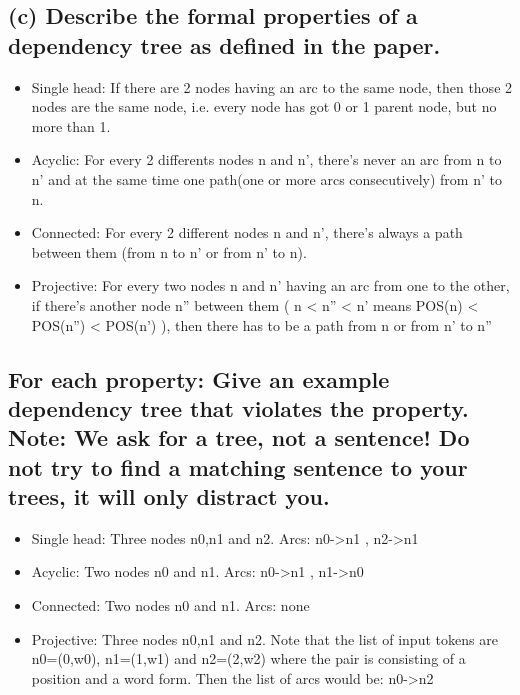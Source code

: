 \documentclass[paper=a4, fontsize=11pt]{scrartcl} %
\numberwithin{equation}{section} %
\numberwithin{figure}{section} %
\numberwithin{table}{section} %
\begin{document}
\subsection*{(c) Describe the formal properties of a dependency tree as defined in the paper.}

\begin{itemize}
	\item Single head: If there are 2 nodes having an arc to the same node, then those 2 nodes are the same node, i.e. every node has got 0 or 1 parent node, but no more than 1.
	\item Acyclic: For every 2 differents nodes n and n', there's never an arc from n to n' and at the same time one path(one or more arcs consecutively) from n' to n.
	\item Connected: For every 2 different nodes n and n', there's always a path between them (from n to n' or from n' to n).
	\item Projective: For every two nodes n and n' having an arc from one to the other, if there's another node n'' between them ( n < n'' < n' means POS(n) < POS(n'') < POS(n') ), then there has to be a path from n or from n' to n''
\end{itemize}

\subsection*{For each property: Give an example dependency tree that violates the property. Note: We ask for a tree, not a sentence! Do not try to find a matching sentence to your trees, it will only distract you.}

\begin{itemize}
	\item Single head: Three nodes n0,n1 and n2. Arcs: n0->n1 , n2->n1
	\item Acyclic: Two nodes n0 and n1. Arcs: n0->n1 , n1->n0
	\item Connected: Two nodes n0 and n1. Arcs: none
	\item Projective: Three nodes n0,n1 and n2. Note that the list of input tokens are n0=(0,w0), n1=(1,w1) and n2=(2,w2) where the pair is consisting of a position and a word form. Then the list of arcs would be: n0->n2
\end{itemize}



\end{document}
